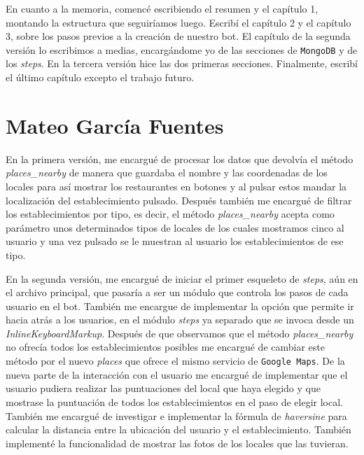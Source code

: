 \documentclass[oneside]{memoir}
\begin{document}
En cuanto a la memoria, comencé escribiendo el resumen y el capítulo 1, montando la estructura que seguiríamos luego. Escribí el capítulo 2 y el capítulo 3, sobre los pasos previos a la creación de nuestro bot. El capítulo de la segunda versión lo escribimos a medias, encargándome yo de las secciones de \texttt{MongoDB} y de los \textit{steps}. En la tercera versión hice las dos primeras secciones. Finalmente, escribí el último capítulo excepto el trabajo futuro. 

\section{Mateo Garc\'ia Fuentes}
En la primera versión, me encargué de procesar los datos que devolvía el método \textit{places\_nearby} de manera que guardaba el nombre y las coordenadas de los locales para así mostrar los restaurantes en botones y al pulsar estos mandar la localización del establecimiento pulsado. Después también me encargué de filtrar los establecimientos por tipo, es decir, el método \textit{places\_nearby} acepta como parámetro unos determinados tipos de locales de los cuales mostramos cinco al usuario y una vez pulsado se le muestran al usuario los establecimientos de ese tipo. 

En la segunda versión, me encargué de iniciar el primer esqueleto de \textit{steps}, aún en el archivo principal, que pasaría a ser un módulo que controla los pasos de cada usuario en el bot. También me encargue de implementar la opción que permite ir hacia atrás a los usuarios, en el módulo \textit{steps} ya separado que se invoca desde un \textit{InlineKeyboardMarkup}. Después de que observamos que el  método \textit{places\_nearby} no ofrecía todos los establecimientos posibles me encargué de cambiar este método por el nuevo \textit{places} que ofrece el mismo servicio de \texttt{Google Maps}. De la nueva parte de la interacción con el usuario me encargué de implementar que el usuario pudiera realizar las puntuaciones del local que haya elegido y que mostrase la puntuación de todos los establecimientos en el paso de elegir local. También me encargué de investigar e implementar la fórmula de \textit{haversine} para calcular la distancia entre la ubicación del usuario y el establecimiento. También implementé  la funcionalidad de mostrar las fotos de los locales que las tuvieran.
\end{document}
